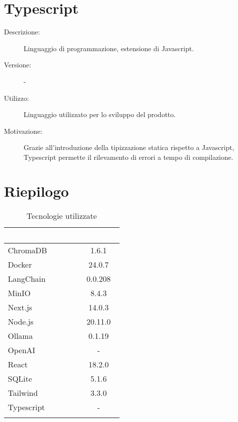 \section{Typescript}
\begin{description}
\item[Descrizione:] Linguaggio di programmazione, estensione di Javascript.
\item[Versione:] -
\item[Utilizzo:] Linguaggio utilizzato per lo sviluppo del prodotto.
\item[Motivazione:] Grazie all'introduzione della tipizzazione statica rispetto a Javascript, Typescript permette il rilevamento di errori a tempo di compilazione.
\end{description}

\section{Riepilogo} \label{sec:riepilogotech}

\begingroup
\setlength{\tabcolsep}{10pt}
\renewcommand{\arraystretch}{1.5}
\begin{xltabular}{0.5\textwidth}{| X | c |}
    \hline
     \textbf{\textcolor{white}{Nome tecnologia}} & \textbf{\textcolor{white}{Versione}} \\
    \hline
    \endhead
    ChromaDB & 1.6.1\\
    \hline
    Docker & 24.0.7\\
    \hline
    LangChain & 0.0.208\\
    \hline
    MinIO & 8.4.3\\
    \hline
    Next.js & 14.0.3\\
    \hline
    Node.js & 20.11.0\\
    \hline
    Ollama & 0.1.19\\
    \hline
    OpenAI & -\\
    \hline
    React & 18.2.0\\
    \hline
    SQLite & 5.1.6\\
    \hline
    Tailwind & 3.3.0\\
    \hline
    Typescript & -\\
    \hline
     \caption{Tecnologie utilizzate}
    \label{tab:reqimp}
\end{xltabular}
\endgroup
